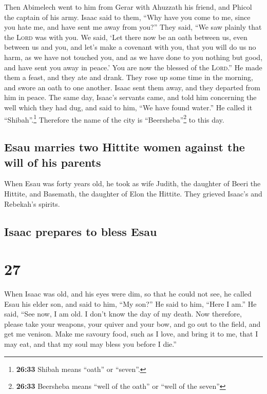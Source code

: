  Then Abimelech went to him from Gerar with Ahuzzath his
friend, and Phicol the captain of his army.  Isaac said
to them, ``Why have you come to me, since you hate me, and have sent me
away from you?''  They said, ``We saw plainly that the
\textsc{Lord} was with you. We said, `Let there now be an oath between
us, even between us and you, and let's make a covenant with you,
 that you will do us no harm, as we have not touched you,
and as we have done to you nothing but good, and have sent you away in
peace.' You are now the blessed of the \textsc{Lord}.'' 
He made them a feast, and they ate and drank.  They rose
up some time in the morning, and swore an oath to one another. Isaac
sent them away, and they departed from him in peace.  The
same day, Isaac's servants came, and told him concerning the well which
they had dug, and said to him, ``We have found water.'' 
He called it ``Shibah''.\footnote{\textbf{26:33} Shibah means ``oath''
  or ``seven''.} Therefore the name of the city is
``Beersheba''\footnote{\textbf{26:33} Beersheba means ``well of the
  oath'' or ``well of the seven''} to this day.

\hypertarget{esau-marries-two-hittite-women-against-the-will-of-his-parents}{%
\subsection{Esau marries two Hittite women against the will of his
parents}\label{esau-marries-two-hittite-women-against-the-will-of-his-parents}}

 When Esau was forty years old, he took as wife Judith,
the daughter of Beeri the Hittite, and Basemath, the daughter of Elon
the Hittite.  They grieved Isaac's and Rebekah's spirits.

\hypertarget{isaac-prepares-to-bless-esau}{%
\subsection{Isaac prepares to bless
Esau}\label{isaac-prepares-to-bless-esau}}

\hypertarget{section-26}{%
\section{27}\label{section-26}}

 When Isaac was old, and his eyes were dim, so that he
could not see, he called Esau his elder son, and said to him, ``My
son?'' He said to him, ``Here I am.''  He said, ``See now,
I am old. I don't know the day of my death.  Now
therefore, please take your weapons, your quiver and your bow, and go
out to the field, and get me venison.  Make me savoury
food, such as I love, and bring it to me, that I may eat, and that my
soul may bless you before I die.''

